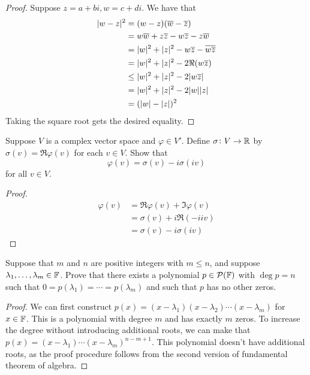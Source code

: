 \documentclass{extarticle}
\begin{document}
\begin{proof}
Suppose \(z = a + b i, w = c + d i\). We have that 
\begin{align*}
    |w - z|^2 
    &= (w - z) (\overline{w} - \overline{z}) \\ 
    &= w\overline{w} + z\overline{z} - w\overline{z} - z\overline{w} \\ 
    &= |w|^2 + |z|^2 - w\overline{z} - \overline{w \overline{z}} \\ 
    &= |w|^2 + |z|^2 - 2\Re(w\overline{z}) \\ 
    &\leq |w|^2 + |z|^2 - 2|w\overline{z}| \\ 
    &= |w|^2 + |z|^2 - 2|w||z| \\ 
    &= (|w| - |z|)^2
\end{align*}
Taking the square root gets the desired equality. 
\end{proof}

\begin{problem}{3}
    Suppose \(V\) is a complex vector space and \(\varphi \in V'\). Define 
    \(\sigma \colon V \to \mathbb{R}\) by \(\sigma(v) = \Re \varphi(v)\) for each \(v \in V\). Show that 
    \[\varphi(v)  =\sigma(v) - i \sigma(iv)\]
    for all \(v \in V\). 
\end{problem}

\begin{proof}
\begin{align*}
    \varphi(v) 
    &= \Re \varphi(v) + \Im \varphi(v)  \\ 
    &= \sigma(v) + i \Re(- ii v) \\ 
    &= \sigma(v) - i \sigma(iv)
\end{align*}
\end{proof}

\begin{problem}{6}
    Suppose that \(m\) and \(n\) are positive integers with \(m \leq n\), and suppose 
    \(\lambda_1, \ldots, \lambda_m \in \mathbb{F}\). Prove that there exists a polynomial 
    \(p \in \mathcal{P}(\mathbb{F})\) with \(\deg p = n\) such that \(0 = p(\lambda_1) = \cdots = p(\lambda_m)\)
    and such that \(p\) has no other zeros. 
\end{problem}

\begin{proof}
We can first construct \(p(x) = (x - \lambda_1)(x - \lambda_2)\cdots(x-\lambda_m)\) for \(x \in \mathbb{F}\). 
This is a polynomial with degree \(m\) and has exactly \(m\) zeros. To increase the degree without 
introducing additional roots, we can make that \(p(x) = (x - \lambda_1)\cdots(x - \lambda_m)^{n-m+1}\). 
This polynomial doesn't have additional roots, as the proof procedure follows from the second 
version of fundamental theorem of algebra. 
\end{proof}
\end{document}
